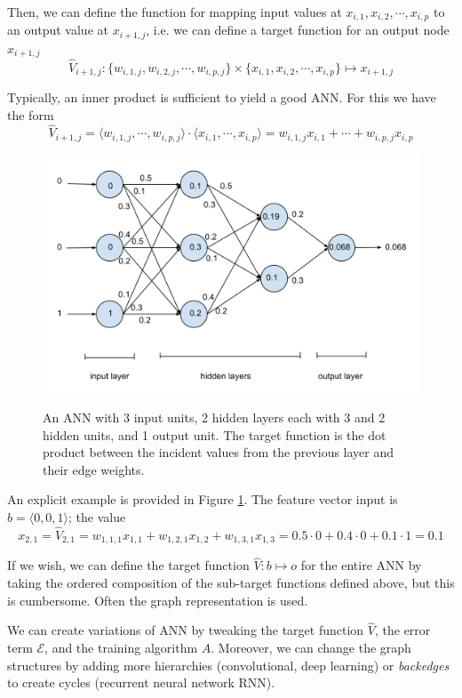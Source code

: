 \documentclass[12pt]{article}  %
\begin{document}
Then, we can define the function for mapping input values at $x_{i,1}, x_{i,2}, \cdots, x_{i,p}$ to an output value at $x_{i+1,j}$, i.e. we can define a target function for an output node $x_{i+1,j}$ $$\hat{V}_{i+1,j} : \{ w_{i,1,j}, w_{i,2,j}, \cdots, w_{i,p,j} \} \times \{ x_{i,1}, x_{i,2}, \cdots, x_{i,p} \} \mapsto x_{i+1,j}$$

Typically, an inner product is sufficient to yield a good ANN. For this we have the form $$\hat{V}_{i+1,j} = \langle  w_{i,1,j}, \cdots, w_{i,p,j}  \rangle \cdot \langle  x_{i,1}, \cdots, x_{i,p}  \rangle = w_{i,1,j}x_{i,1} + \cdots + w_{i,p,j}x_{i,p}$$

\begin{figure}
\centering
\includegraphics[scale=0.5]{images/ANN.png}\\
\caption{An ANN with 3 input units, 2 hidden layers each with 3 and 2 hidden units, and 1 output unit. The target function is the dot product between the incident values from the previous layer and their edge weights.}\label{ANN-fig}
\end{figure}

An explicit example is provided in Figure \ref{ANN-fig}. The feature vector input is $b = \langle 0,0,1 \rangle$; the value $$x_{2,1} = \hat{V}_{2,1} = w_{1,1,1}x_{1,1} + w_{1,2,1}x_{1,2} + w_{1,3,1}x_{1,3} = 0.5 \cdot 0 + 0.4 \cdot 0 + 0.1 \cdot 1 = 0.1$$

If we wish, we can define the target function $\hat{V} : b \mapsto o$ for the entire ANN by taking the ordered composition of the sub-target functions defined above, but this is cumbersome. Often the graph representation is used.

We can create variations of ANN by tweaking the target function $\hat{V}$, the error term $\mathcal{E}$, and the training algorithm $A$. Moreover, we can change the graph structures by adding more hierarchies (convolutional, deep learning) or {\em backedges} to create cycles (recurrent neural network RNN).
\end{document}
